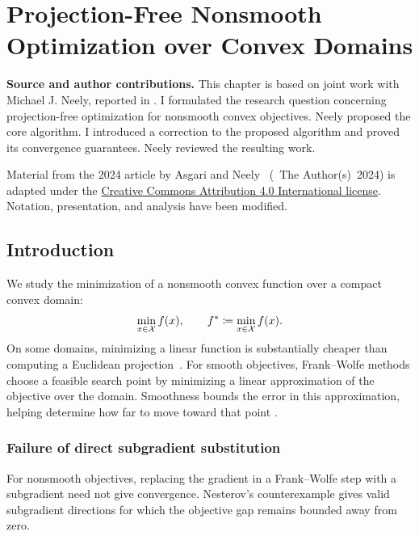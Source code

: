 \chapter{Projection-Free Nonsmooth Optimization over Convex Domains}
\label{Section:projfree-domain}

\noindent\textbf{Source and author contributions.}
This chapter is based on joint work with Michael J. Neely, reported in
\cite{asgari2026projectionfree,asgari2024nonsmooth}.
I formulated the research question concerning projection-free optimization
for nonsmooth convex objectives. Neely proposed the core algorithm.
I introduced a correction to the proposed algorithm and proved its
convergence guarantees. Neely reviewed the resulting work.

Material from the 2024 article by Asgari and Neely~\cite{asgari2024nonsmooth}
(\textcopyright~The Author(s)~2024) is adapted under the
\href{https://creativecommons.org/licenses/by/4.0/}{Creative Commons
Attribution 4.0 International license}. Notation, presentation, and analysis
have been modified.

\section{Introduction}

We study the minimization of a nonsmooth convex function over a compact
convex domain:
\begin{equation}\label{eq:pfdom:problem}
    \min_{x\in\mathcal{X}}f(x),\qquad
    f^*\coloneqq\min_{x\in\mathcal{X}}f(x).
\end{equation}
On some domains, minimizing a linear function is substantially cheaper
than computing a Euclidean projection~\cite{COMBETTES2021565,pmlr-v28-jaggi13}.
For smooth objectives, Frank--Wolfe methods choose a feasible search point
by minimizing a linear approximation of the objective over the domain.
Smoothness bounds the error in this approximation, helping determine how
far to move toward that point
\cite{https://doi.org/10.1002/nav.3800030109,pmlr-v28-jaggi13}.

\subsection{Failure of direct subgradient substitution}
\label{sec:Nesterov's Counterexample}

For nonsmooth objectives, replacing the gradient in a Frank--Wolfe step
with a subgradient need not give convergence. Nesterov's counterexample
\cite[Example~1]{Nesterov2018} gives valid subgradient directions for which
the objective gap remains bounded away from zero.

